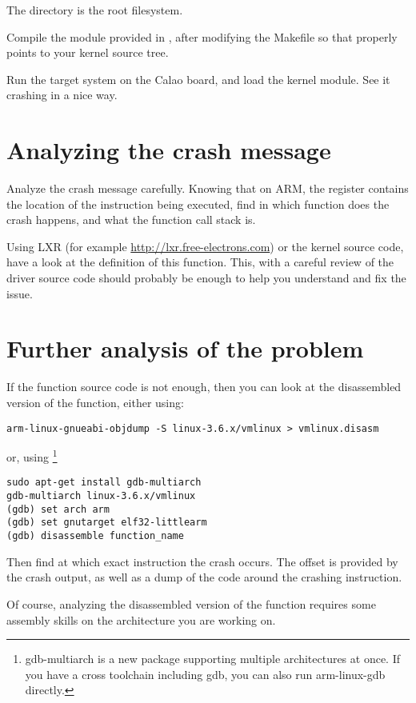 The  directory is the root filesystem.

Compile the  module provided
  in , after modifying the Makefile so
  that  properly points to your kernel source tree.

Run the target system on the Calao board, and load the 
kernel module. See it crashing in a nice way.

\section{Analyzing the crash message}

Analyze the crash message carefully. Knowing that on ARM, the 
register contains the location of the instruction being executed, find
in which function does the crash happens, and what the function call
stack is.

Using LXR (for example \url{http://lxr.free-electrons.com}) or the
kernel source code, have a look at the definition of this
function. This, with a careful review of the driver source code should
probably be enough to help you understand and fix the issue.

\section{Further analysis of the problem}

If the function source code is not enough, then you can look at the
disassembled version of the function, either using:

\begin{verbatim}
arm-linux-gnueabi-objdump -S linux-3.6.x/vmlinux > vmlinux.disasm
\end{verbatim}

or, using \footnote{gdb-multiarch is a new package
  supporting multiple architectures at once. If you have a cross
  toolchain including gdb, you can also run arm-linux-gdb directly.}

\begin{verbatim}
sudo apt-get install gdb-multiarch
gdb-multiarch linux-3.6.x/vmlinux
(gdb) set arch arm
(gdb) set gnutarget elf32-littlearm
(gdb) disassemble function_name
\end{verbatim}

Then find at which exact instruction the crash occurs. The offset is
provided by the crash output, as well as a dump of the code around the
crashing instruction.

Of course, analyzing the disassembled version of the function requires
some assembly skills on the architecture you are working on.
